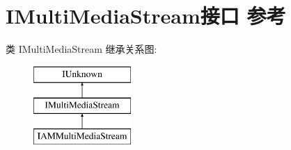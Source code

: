 \hypertarget{interface_i_multi_media_stream}{}\section{I\+Multi\+Media\+Stream接口 参考}
\label{interface_i_multi_media_stream}
类 I\+Multi\+Media\+Stream 继承关系图\+:\begin{figure}[H]
\begin{center}
\leavevmode
\includegraphics[height=3.000000cm]{interface_i_multi_media_stream}
\end{center}
\end{figure}
